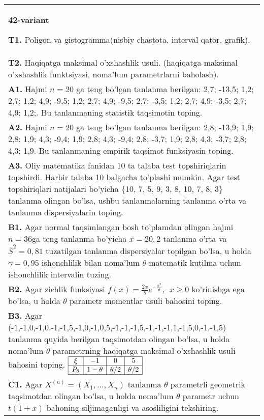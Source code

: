 \documentclass{article}
\begin{document}
\begin{tabular}{m{17cm}}
\textbf{42-variant}
\newline

\textbf{T1.} 
Poligon va gistogramma(nisbiy chastota, interval qator, grafik).
\\
\textbf{T2.} 
Haqiqatga maksimal o'xshashlik usuli. (haqiqatga maksimal o'xshashlik funktsiyasi, noma'lum parametrlarni baholash).
\\
\textbf{A1.} 
Hajmi \(n = 20\) ga teng bo'lgan tanlanma berilgan: 2,7; -13,5; 1,2; 2,7; 1,2; 4,9; -9,5; 1,2; 2,7; 4,9; -9,5; 2,7; -3,5; 1,2; 2,7; 4,9; -3,5; 2,7; 4,9; 1,2;. Bu tanlanmaning statistik taqsimotin toping.
\\
\textbf{A2.} 
Hajmi \(n = 20\) ga teng bo'lgan tanlanma berilgan: 2,8; -13,9; 1,9; 2,8; 1,9; 4,3; -9,4; 1,9; 2,8; 4,3; -9,4; 2,8; -3,7; 1,9; 2,8; 4,3; -3,7; 2,8; 4,3; 1,9. Bu tanlanmaning empirik taqsimot funksiyasin toping.
\\
\textbf{A3.} 
Oliy matematika fanidan 10 ta talaba test topshiriqlarin topshirdi. Harbir talaba 10 balgacha to'plashi mumkin. Agar test topshiriqlari natijalari bo'yicha \{10, 7, 5, 9, 3, 8, 10, 7, 8, 3\} tanlanma olingan bo'lsa, ushbu tanlanmalarning tanlanma o'rta va tanlanma dispersiyalarin toping.
\\
\textbf{B1.} 
Agar normal taqsimlangan bosh to'plamdan olingan hajmi \(n = 36\)ga teng tanlanma bo'yicha \(\overline{x} = 20,2\) tanlanma o'rta va \({\overline{S}}^{2} = 0,81\) tuzatilgan tanlanma dispersiyalar topilgan bo'lsa, u holda \(\gamma = 0,95\) ishonchlilik bilan noma'lum \(\theta\) matematik kutilma uchun ishonchlilik intervalin tuzing.
\\
\textbf{B2.} 
Agar zichlik funksiyasi \(f(x) = \frac{2x}{\theta}e^{- \frac{x^{2}}{\theta}},\ \ x \geq 0\) ko'rinishga ega bo'lsa, u holda \(\theta\) parametr momentlar usuli bahosini toping.
\\
\textbf{B3.} 
Agar (-1,-1,0,-1,0,-1,-1,5,-1,0,-1,0,5,-1,-1,-1,5,-1,-1,-1,1,-1,5,0,-1,-1,5) tanlanma quyida berilgan taqsimotdan olingan bo'lsa, u holda noma'lum \(\theta\) parametrning haqiqatga maksimal o'xshashlik usuli bahosini toping.
$\begin{array}{|c|c|c|c|}
    \hline
    \xi & - 1 & 0 & 5\\
    \hline
    P_{\theta} & 1 - \theta & \theta/2 & \theta/2 \\
    \hline
\end{array}$
\\
\textbf{C1.} 
Agar \(X^{(n)} = \left( X_{1},...,X_{n} \right)\) tanlanma \(\theta\) parametrli geometrik taqsimotdan olingan bo'lsa, u holda noma'lum \(\theta\) parametr uchun \(t(1 + \overline{x})\) bahoning siljimaganligi va asosliligini tekshiring.

\end{tabular}
\end{document}
